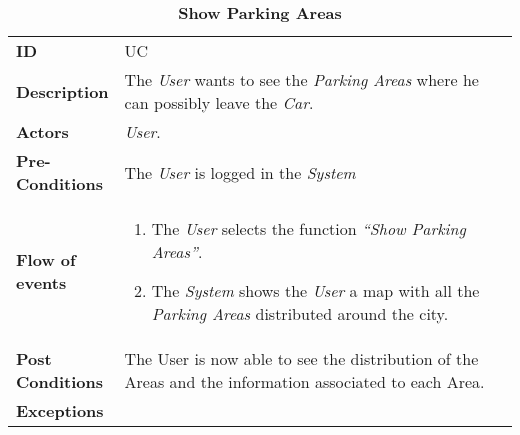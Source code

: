 \begin{longtable}{|p{0.2\linewidth} | p{0.8\linewidth}|}
	\captionsetup{labelformat=empty} %
	\caption{\textbf{Show Parking Areas}} %
	\label{UC_ShowAreas}%
	\\ \hline %
	
	\textbf{ID} & UC\theUseCaseIdCounter \\ \hline
	\textbf{Description} & The \emph{User} wants to see the \emph{Parking Areas} where he can possibly leave the \emph{Car}. \\ \hline
	\textbf{Actors} & \emph{User}.\\ \hline
	\textbf{Pre-Conditions} & The \emph{User} is logged in the \emph{System} \\ \hline
	\textbf{Flow of events} & 
	\begin{enumerate}
		\item The \emph{User} selects the function \textit{\textquotedblleft{Show Parking Areas}\textquotedblright}.
		\item The \emph{System} shows the \emph{User} a map with all the \emph{Parking Areas} distributed around the city.
	\end{enumerate}	 \\ \hline
	\textbf{Post Conditions} & The User is now able to see the distribution of the Areas and the information associated to each Area.\\ \hline
	\textbf{Exceptions} & \\ \hline
\end{longtable}


